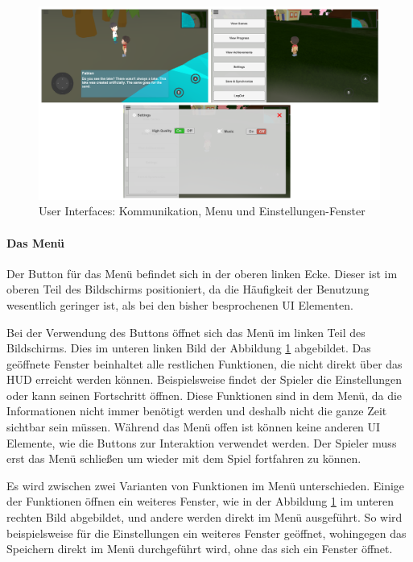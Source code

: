 				\begin{figure}[htbp]
					\centering 
					\label{userInterfaces}
					\includegraphics[width=\textwidth]{pics/userInterface.png}
					\caption{User Interfaces: Kommunikation, Menu und Einstellungen-Fenster}
				\end{figure}
			
			\paragraph{Das Menü}
				Der Button für das Menü befindet sich in der oberen linken Ecke. Dieser ist im oberen Teil des Bildschirms positioniert, da die Häufigkeit der Benutzung wesentlich geringer ist, als bei den bisher besprochenen UI Elementen.
				
				Bei der Verwendung des Buttons öffnet sich das Menü im linken Teil des Bildschirms. Dies im unteren linken Bild der Abbildung \ref{userInterfaces} abgebildet. Das geöffnete Fenster beinhaltet alle restlichen Funktionen, die nicht direkt über das HUD erreicht werden können. Beispielsweise findet der Spieler die Einstellungen oder kann seinen Fortschritt öffnen. Diese Funktionen sind in dem Menü, da die Informationen nicht immer benötigt werden und deshalb nicht die ganze Zeit sichtbar sein müssen. Während das Menü offen ist können keine anderen UI Elemente, wie die Buttons zur Interaktion verwendet werden. Der Spieler muss erst das Menü schließen um wieder mit dem Spiel fortfahren zu können. 
				
				Es wird zwischen zwei Varianten von Funktionen im Menü unterschieden. Einige der Funktionen öffnen ein weiteres Fenster, wie in der Abbildung \ref{userInterfaces} im unteren rechten Bild abgebildet, und andere werden direkt im Menü ausgeführt. So wird beispielsweise für die Einstellungen ein weiteres Fenster geöffnet, wohingegen das Speichern direkt im Menü durchgeführt wird, ohne das sich ein Fenster öffnet.
			
